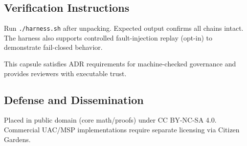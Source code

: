 \subsection{Verification Instructions}
Run \texttt{./harness.sh} after unpacking. Expected output confirms all chains intact. The harness also supports controlled fault-injection replay (opt-in) to demonstrate fail-closed behavior.

This capsule satisfies ADR requirements for machine-checked governance and provides reviewers with executable trust.

\subsection{Defense and Dissemination}
Placed in public domain (core math/proofs) under CC BY-NC-SA 4.0. Commercial UAC/MSP implementations require separate licensing via Citizen Gardens.
